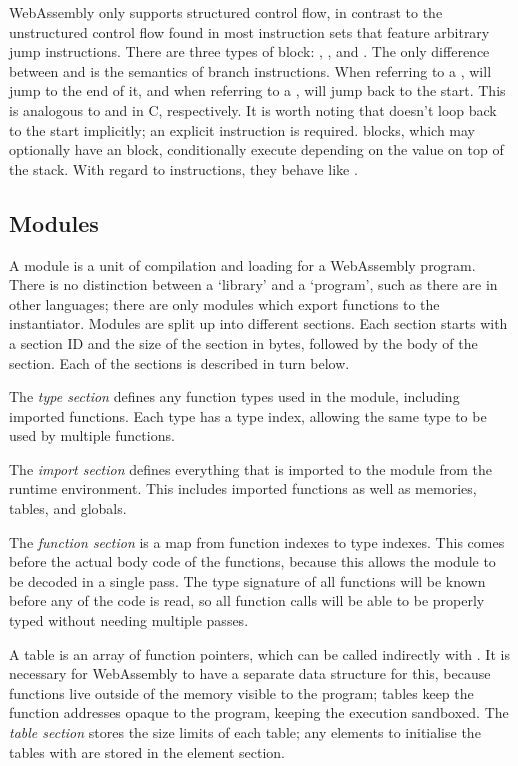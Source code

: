 \documentclass[00-main.tex]{subfiles}
\begin{document}
WebAssembly only supports structured control flow, in contrast to the unstructured control flow found in most instruction sets that feature arbitrary jump instructions.
There are three types of block: , , and .
The only difference between  and  is the semantics of branch instructions.
When referring to a ,  will jump to the end of it, and when referring to a ,  will jump back to the start.
This is analogous to  and  in C, respectively.
It is worth noting that  doesn't loop back to the start implicitly; an explicit  instruction is required.
 blocks, which may optionally have an  block, conditionally execute depending on the value on top of the stack.
With regard to  instructions, they behave like .


\subsection{Modules}

A module is a unit of compilation and loading for a WebAssembly program.
There is no distinction between a `library' and a `program', such as there are in other languages; there are only modules which export functions to the instantiator.
Modules are split up into different sections.
Each section starts with a section ID and the size of the section in bytes, followed by the body of the section.
Each of the sections is described in turn below.

The \emph{type section} defines any function types used in the module, including imported functions.
Each type has a type index, allowing the same type to be used by multiple functions.

The \emph{import section} defines everything that is imported to the module from the runtime environment.
This includes imported functions as well as memories, tables, and globals.

The \emph{function section} is a map from function indexes to type indexes.
This comes before the actual body code of the functions, because this allows the module to be decoded in a single pass.
The type signature of all functions will be known before any of the code is read, so all function calls will be able to be properly typed without needing multiple passes.

A table is an array of function pointers, which can be called indirectly with .
It is necessary for WebAssembly to have a separate data structure for this, because functions live outside of the memory visible to the program; tables keep the function addresses opaque to the program, keeping the execution sandboxed.
The \emph{table section} stores the size limits of each table; any elements to initialise the tables with are stored in the element section.
\end{document}
